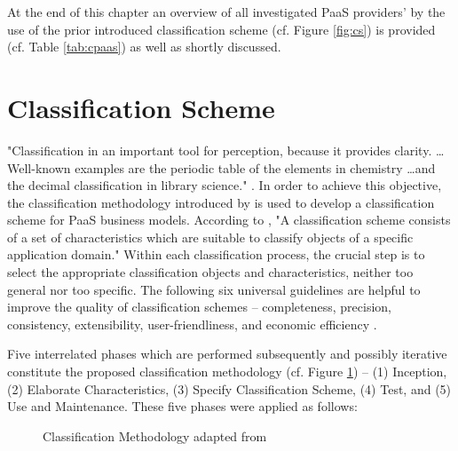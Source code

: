 At the end of this chapter an overview of all investigated \ac{PaaS} providers' by the use of the prior introduced classification scheme (cf. Figure \ref{fig:cs}) is provided (cf. Table \ref{tab:cpaas}) as well as shortly discussed.



\section{Classification Scheme}\label{ch:sota:cm}

"Classification in an important tool for perception, because it provides clarity. \ldots Well-known examples are the periodic table of the elements in chemistry \ldots and the decimal classification in library science." \citep[p. 36]{Fettke2003}. In order to achieve this objective, the classification methodology introduced by \citet{Fettke2003} is used to develop a classification scheme for \ac{PaaS} business models. According to \citet[p. 39]{Fettke2003}, "A classification scheme consists of a set of characteristics which are suitable to classify objects of a specific application domain." Within each classification process, the crucial step is to select the appropriate classification objects and characteristics, neither too general nor too specific. The following six universal guidelines are helpful to improve the quality of classification schemes -- completeness, precision, consistency, extensibility, user-friendliness, and economic efficiency \citep[pp. 40-41]{Fettke2003}. 

Five interrelated phases which are performed subsequently and possibly iterative constitute the proposed classification methodology (cf. Figure \ref{fig:cm}) -- (1) Inception, (2) Elaborate Characteristics, (3) Specify Classification Scheme, (4) Test, and (5) Use and Maintenance. These five phases were applied as follows:

\begin{figure}[htb]
	\centering
	
	\caption[Classification Methodology]{Classification Methodology adapted from \citet[p. 44]{Fettke2003}}
	\label{fig:cm}
\end{figure}

